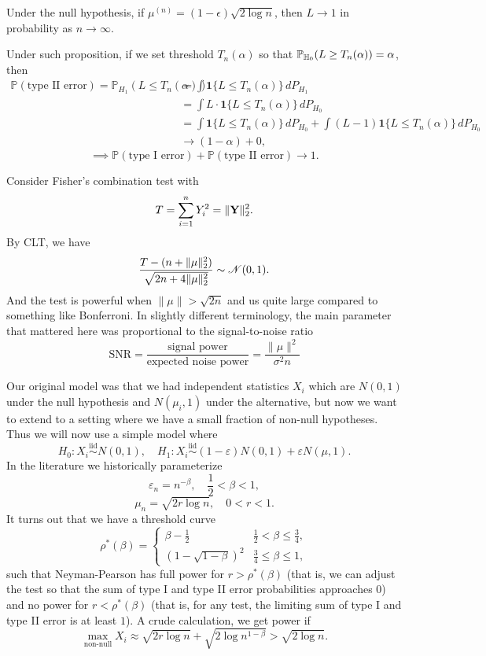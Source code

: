 \begin{prop}
Under the null hypothesis, if $\mu^{(n)} = (1 - \epsilon)\sqrt{2 \log n}$, then $L \to 1$ in probability as $n \to \infty$.
\end{prop}
Under such proposition, if we set threshold $T_n(\alpha)$ so that $\mathbb{P}_{\mathbb{H}_0}(L\ge T_n(\alpha)) = \alpha$, then
\begin{align*}
\mathbb{P}(\text{type II error}) = \mathbb{P}_{H_1}(L \leq T_n(\alpha)) &= \int \mathbf{1}\{L \leq T_n(\alpha)\} \, dP_{H_1} \\
&= \int L \cdot \mathbf{1}\{L \leq T_n(\alpha)\} \, dP_{H_0} \\
&= \int \mathbf{1}\{L \leq T_n(\alpha)\} \, dP_{H_0} + \int (L - 1) \mathbf{1}\{L \leq T_n(\alpha)\} \, dP_{H_0} \\
&\to (1-\alpha) + 0,
\end{align*}
\[
\implies \mathbb{P}(\text{type I error})+\mathbb{P}(\text{type II error}) \to 1.
\]
\begin{rem}
    Consider Fisher's combination test with
    \[
    T = \sum_{i=1}^n Y_i^2 = \|\mathbf{Y}\|_2^2.
    \]
    By CLT, we have
    \[
    \frac{T- (n+\|\mu\|_2^2)}{\sqrt{2n+4\|\mu\|_2^2}} \sim \mathcal N(0,1).
    \]
    And the test is powerful when $\|\mu\| > \sqrt{2n}$ and us quite large compared to something like Bonferroni. In slightly different terminology, the main parameter that mattered here was proportional to the signal-to-noise ratio
    \[
    \text{SNR} = \frac{\text{signal power}}{\text{expected noise power}} = \frac{\|\mu\|^2}{\sigma^2 n}
    \]
\end{rem}
Our original model was that we had independent statistics $X_i$ which are $N(0, 1)$ under the null hypothesis and $N(\mu_i, 1)$ under the alternative, but now we want to extend to a setting where we have a small fraction of non-null hypotheses. Thus we will now use a simple model where
\[
H_0 : X_i \stackrel{\text{iid}}{\sim} N(0, 1), \quad H_1 : X_i \stackrel{\text{iid}}{\sim} (1 - \varepsilon) N(0, 1) + \varepsilon N(\mu, 1).
\]
In the literature we historically parameterize
\[
\varepsilon_n = n^{-\beta}, \quad \frac{1}{2} < \beta < 1,
\]
\[
\mu_n = \sqrt{2r \log n}, \quad 0 < r < 1.
\]
It turns out that we have a threshold curve
\[
\rho^*(\beta) = \begin{cases} \beta - \frac{1}{2} & \frac{1}{2} < \beta \leq \frac{3}{4}, \\ (1 - \sqrt{1 - \beta})^2 & \frac{3}{4} \leq \beta \leq 1, \end{cases}
\]
such that Neyman-Pearson has full power for $r > \rho^*(\beta)$ (that is, we can adjust the test so that the sum of type I and type II error probabilities approaches $0$) and no power for $r < \rho^*(\beta)$ (that is, for any test, the limiting sum of type I and type II error is at least $1$). A crude calculation, we get power if
\[
\max_{\text{non-null}} X_i \approx \sqrt{2r \log n} + \sqrt{2 \log n^{1-\beta}} > \sqrt{2 \log n}.
\]

